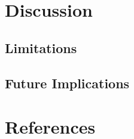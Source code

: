 \documentclass[
  english,
  a4paper,floatsintext]{apa7}
\begin{document}
\hypertarget{discussion}{%
\section{Discussion}\label{discussion}}

\hypertarget{limitations}{%
\subsection{Limitations}\label{limitations}}

\hypertarget{future-implications}{%
\subsection{Future Implications}\label{future-implications}}

\newpage

\hypertarget{references}{%
\section{References}\label{references}}

\begingroup
\setlength{\parindent}{-0.5in}
\setlength{\leftskip}{0.5in}
\end{document}
